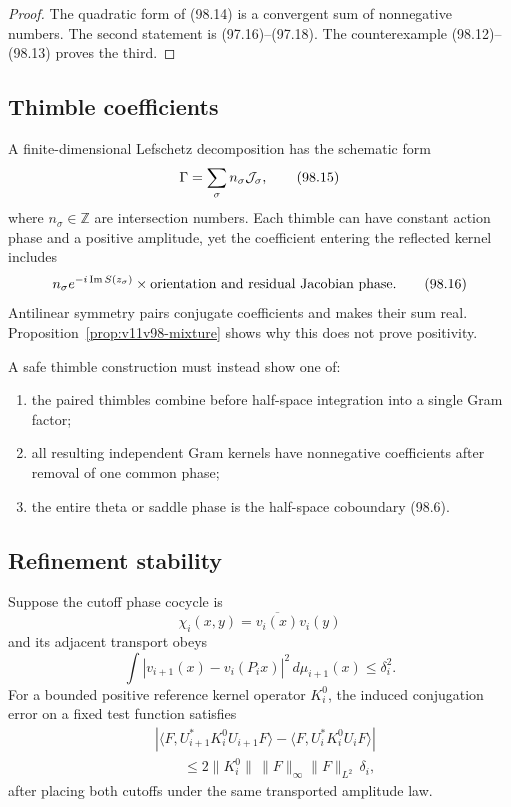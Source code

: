 \documentclass[11pt]{article}
\begin{document}
\begin{proof}
The quadratic form of (98.14) is a convergent sum of nonnegative
numbers.  The second statement is (97.16)--(97.18).  The
counterexample (98.12)--(98.13) proves the third.
\end{proof}

\subsection{Thimble coefficients}

A finite-dimensional Lefschetz decomposition has the schematic form
\[
                              \Gamma=\sum_\sigma n_\sigma
                                      {\cal J}_\sigma,       \tag{98.15}
\]
where \(n_\sigma\in\mathbb Z\) are intersection numbers.  Each thimble
can have constant action phase and a positive amplitude, yet the
coefficient entering the reflected kernel includes
\[
 n_\sigma e^{-i\operatorname{Im}S(z_\sigma)}
          \times\hbox{orientation and residual Jacobian phase}.    \tag{98.16}
\]
Antilinear symmetry pairs conjugate coefficients and makes their sum
real.  Proposition~\ref{prop:v11v98-mixture} shows why this does not
prove positivity.

A safe thimble construction must instead show one of:
\begin{enumerate}
\item the paired thimbles combine before half-space integration into
      a single Gram factor;
\item all resulting independent Gram kernels have nonnegative
      coefficients after removal of one common phase;
\item the entire theta or saddle phase is the half-space coboundary
      (98.6).
\end{enumerate}

\subsection{Refinement stability}

Suppose the cutoff phase cocycle is
\[
 \chi_i(x,y)=\overline{v_i(x)}v_i(y)                         \tag{98.17}
\]
and its adjacent transport obeys
\[
 \int|v_{i+1}(x)-v_i(P_ix)|^2\,d\mu_{i+1}(x)
                              \le\delta_i^2.                 \tag{98.18}
\]
For a bounded positive reference kernel operator \(K_i^0\), the
induced conjugation error on a fixed test function satisfies
\[
 \begin{split}
 &|\langle F,U_{i+1}^*K_i^0U_{i+1}F\rangle
   -\langle F,U_i^*K_i^0U_iF\rangle|\\
 &\qquad\le
 2\|K_i^0\|\,\|F\|_\infty\|F\|_{L^2}\,\delta_i,             \tag{98.19}
 \end{split}
\]
after placing both cutoffs under the same transported amplitude law.
\end{document}
